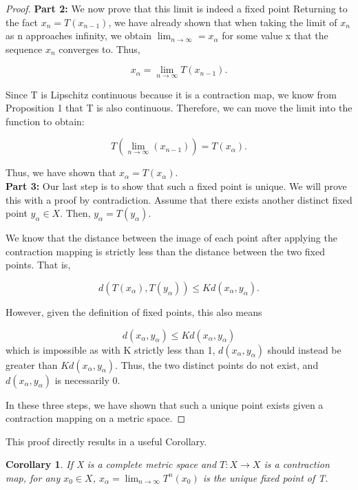 \documentclass{article}
\newtheorem{corollary}{Corollary}[theorem]
\theoremstyle{remark}
\begin{document}
\begin{proof}
\textbf{Part 2:} We now prove that this limit is indeed a fixed point
Returning to the fact $x_{n} = T(x_{n-1})$, we have already shown that when taking the limit of $x_{n}$ as n approaches infinity, we obtain $\lim_{n \to \infty} = x_{\alpha}$ for some value x that the sequence $x_n$ converges to. Thus,

$$x_{\alpha} = \lim_{n \to \infty} T(x_{n-1}).$$

Since T is Lipschitz continuous because it is a contraction map, we know from Proposition 1 that T is also continuous. Therefore, we can move the limit into the function to obtain:


$$ T(\lim_{n \to \infty}(x_{n-1})) = T(x_{\alpha}).$$

Thus, we have shown that $x_\alpha = T(x_\alpha)$.\\

\textbf{Part 3:} Our last step is to show that such a fixed point is unique. We will prove this with a proof by contradiction. Assume that there exists another distinct fixed point $y_{\alpha} \in X$. Then, $y_{\alpha} = T(y_{\alpha})$.

We know that the distance between the image of each point after applying the contraction mapping is strictly less than the distance between the two fixed points. That is,

$$d(T(x_{\alpha}), T(y_{\alpha})) \leq Kd(x_{\alpha}, y_{\alpha}).$$



However, given the definition of fixed points, this also means

$$d(x_{\alpha}, y_{\alpha}) \leq Kd(x_{\alpha}, y_{\alpha})$$
which is impossible as with K  strictly less than 1, $d(x_{\alpha}, y_{\alpha})$ should instead be greater than $Kd(x_{\alpha}, y_{\alpha})$. Thus, the two distinct points do not exist, and $d(x_{\alpha}, y_{\alpha})$ is necessarily 0.

In these three steps, we have shown that such a unique point exists given a contraction mapping on a metric space.

\end{proof}


This proof directly results in a useful Corollary.  \\
\begin{corollary} If X is a complete metric space and $T: X \to X$ is a contraction map, for any $x_0 \in X$, $x_\alpha = \lim_{n \to \infty}T^n(x_0)$ is the unique fixed point of T.
\end{corollary}
\end{document}
